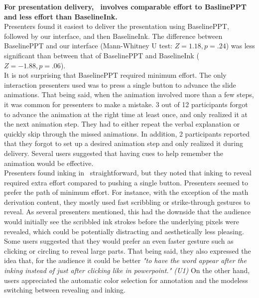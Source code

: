 \textbf{For presentation delivery, \interface\ involves comparable effort to BaslinePPT and less effort than BaselineInk.}\\
Presenters found it easiest to deliver the presentation using BaselinePPT, followed by our interface, and then BaselineInk. The difference between BaselinePPT and our interface (Mann-Whitney U test: $Z = 1.18, p = .24$) was less significant than between that of BaselinePPT and BaselineInk ($Z = -1.88, p = .06$). \\
It is not surprising that BaselinePPT required minimum effort. The only interaction presenters used was to press a single button to advance the slide animations. That being said, when the animation involved more than a few steps, it was common for presenters to make a mistake. 3 out of 12 participants forgot to advance the animation at the right time at least once, and only realized it at the next animation step. They had to either repeat the verbal explanation or quickly skip through the missed animations. In addition, 2 participants reported that they forgot to set up a desired animation step and only realized it during delivery. Several users suggested that having cues to help remember the animation would be effective.\\
Presenters found inking in \interface\ straightforward, but they noted that inking to reveal required extra effort compared to pushing a single button. Presenters seemed to prefer the path of minimum effort. For instance, with the exception of the math derivation content, they mostly used fast scribbling or strike-through gestures to reveal. As several presenters mentioned, this had the downside that the audience would initially see the scribbled ink strokes before the underlying pixels were revealed, which could be potentially distracting and aesthetically less pleasing. Some users suggested that they would prefer an even faster gesture such as clicking or circling to reveal large parts. That being said, they also expressed the idea that, for the audience it could be better  \textit{"to have the word appear after the inking instead of just after clicking like in powerpoint." (U1)}  On the other hand, users appreciated the automatic color selection for annotation and the modeless switching between revealing and inking. \\
